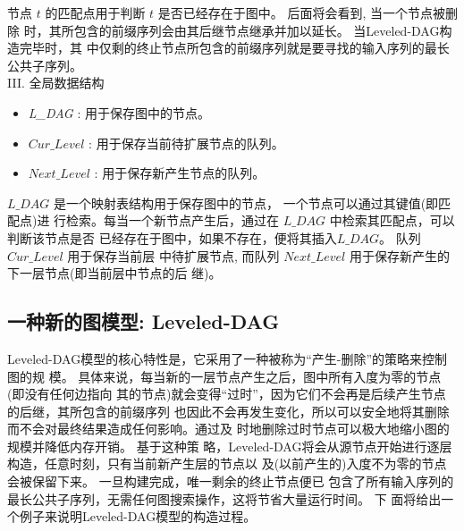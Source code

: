 节点 $t$ 的匹配点用于判断 $t$ 是否已经存在于图中。 后面将会看到, 当一个节点被删除
时，其所包含的前缀序列会由其后继节点继承并加以延长。 当Leveled-DAG构造完毕时，其
中仅剩的终止节点所包含的前缀序列就是要寻找的输入序列的最长公共子序列。\\

\noindent III. 全局数据结构
\label{sec:auxiliary}

\begin{itemize}
\item \emph{L\_DAG} : 用于保存图中的节点。
\item $Cur\_Level$ : 用于保存当前待扩展节点的队列。
\item $Next\_Level$ : 用于保存新产生节点的队列。
\end{itemize}



$L\_DAG$ 是一个映射表结构用于保存图中的节点， 一个节点可以通过其键值(即匹配点)进
行检索。每当一个新节点产生后，通过在 $L\_DAG$ 中检索其匹配点，可以判断该节点是否
已经存在于图中，如果不存在，便将其插入$L\_DAG$。 队列 $Cur\_Level$ 用于保存当前层
中待扩展节点, 而队列 $Next\_Level$ 用于保存新产生的下一层节点(即当前层中节点的后
继)。


\subsection{一种新的图模型: Leveled-DAG}
\label{sec:leveled DAG}

Leveled-DAG模型的核心特性是，它采用了一种被称为“产生-删除”的策略来控制图的规
模。 具体来说，每当新的一层节点产生之后，图中所有入度为零的节点(即没有任何边指向
其的节点)就会变得“过时”，因为它们不会再是后续产生节点的后继，其所包含的前缀序列
也因此不会再发生变化，所以可以安全地将其删除而不会对最终结果造成任何影响。通过及
时地删除过时节点可以极大地缩小图的规模并降低内存开销。 基于这种策
略，Leveled-DAG将会从源节点开始进行逐层构造，任意时刻，只有当前新产生层的节点以
及(以前产生的)入度不为零的节点会被保留下来。 一旦构建完成，唯一剩余的终止节点便已
包含了所有输入序列的最长公共子序列，无需任何图搜索操作，这将节省大量运行时间。 下
面将给出一个例子来说明Leveled-DAG模型的构造过程。

